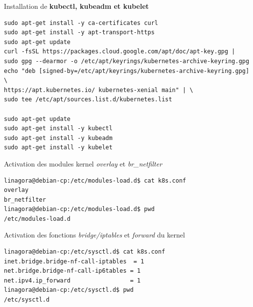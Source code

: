 \begin{frame}[fragile,shrink=0.9]{Installation de \textbf{kubectl, kubeadm et kubelet}}

\begin{tiny}
\begin{Verbatim}[commandchars=\&\#\#]
sudo apt-get install -y ca-certificates curl
sudo apt-get install -y apt-transport-https
sudo apt-get update
curl -fsSL https://packages.cloud.google.com/apt/doc/apt-key.gpg | sudo gpg --dearmor -o /etc/apt/keyrings/kubernetes-archive-keyring.gpg
echo "deb [signed-by=/etc/apt/keyrings/kubernetes-archive-keyring.gpg] \
https://apt.kubernetes.io/ kubernetes-xenial main" | \
sudo tee /etc/apt/sources.list.d/kubernetes.list

sudo apt-get update
sudo apt-get install -y kubectl
sudo apt-get install -y kubeadm
sudo apt-get install -y kubelet
\end{Verbatim}
\end{tiny}

\end{frame}


\begin{frame}[fragile]{Activation des modules kernel \textit{overlay} et \textit{br\_netfilter}}

\begin{tiny}
\begin{Verbatim}[commandchars=\&\#\#]
linagora@debian-cp:/etc/modules-load.d$ cat k8s.conf 
overlay
br_netfilter
linagora@debian-cp:/etc/modules-load.d$ pwd
/etc/modules-load.d
\end{Verbatim}
\end{tiny}

\end{frame}


\begin{frame}[fragile]{Activation des fonctions \textit{bridge/iptables} et \textit{forward} du kernel}

\begin{tiny}
\begin{Verbatim}[commandchars=\&\#\#]
linagora@debian-cp:/etc/sysctl.d$ cat k8s.conf 
inet.bridge.bridge-nf-call-iptables  = 1
net.bridge.bridge-nf-call-ip6tables = 1
net.ipv4.ip_forward                 = 1
linagora@debian-cp:/etc/sysctl.d$ pwd
/etc/sysctl.d
\end{Verbatim}
\end{tiny}

\end{frame}


